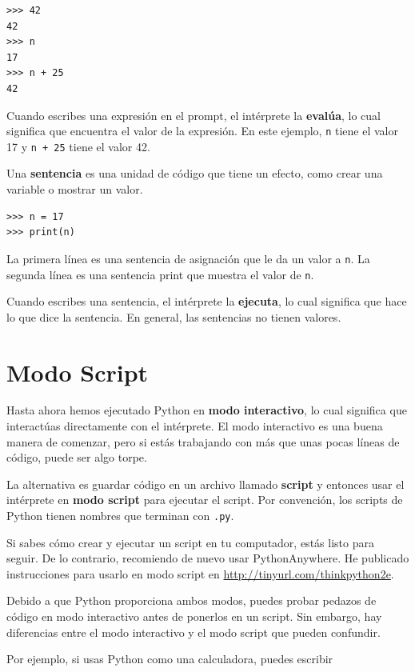\documentclass[10pt]{book}
\begin{document}
\begin{verbatim}
>>> 42
42
>>> n
17
>>> n + 25
42
\end{verbatim}
%
Cuando escribes una expresión en el prompt, el intérprete
la {\bf evalúa}, lo cual significa que encuentra el valor de
la expresión.
En este ejemplo, {\tt n} tiene el valor 17 y
{\tt n + 25} tiene el valor 42.

Una {\bf sentencia} es una unidad de código que tiene un efecto, como
crear una variable o mostrar un valor.

\begin{verbatim}
>>> n = 17
>>> print(n)
\end{verbatim}
%
La primera línea es una sentencia de asignación que le da un valor a
{\tt n}.  La segunda línea es una sentencia print que muestra el
valor de {\tt n}.

Cuando escribes una sentencia, el intérprete la {\bf ejecuta},
lo cual significa que hace lo que dice la sentencia.  En general,
las sentencias no tienen valores.


\section{Modo Script}

Hasta ahora hemos ejecutado Python en {\bf modo interactivo}, lo cual
significa que interactúas directamente con el intérprete.
El modo interactivo es una buena manera de comenzar,
pero si estás trabajando con más que unas pocas líneas de código, puede ser
algo torpe.

La alternativa es guardar código en un archivo llamado {\bf script} y
entonces usar el intérprete en {\bf modo script} para ejecutar el script.  Por
convención, los scripts de Python tienen nombres que terminan con {\tt .py}.

Si sabes cómo crear y ejecutar un script en tu computador, estás
listo para seguir.  De lo contrario, recomiendo de nuevo usar PythonAnywhere.
He publicado instrucciones para usarlo en modo script en
\url{http://tinyurl.com/thinkpython2e}.

Debido a que Python proporciona ambos modos,
puedes probar pedazos de código en modo interactivo antes de ponerlos
en un script.  Sin embargo, hay diferencias entre el modo interactivo
y el modo script que pueden confundir.

Por ejemplo, si usas Python como una calculadora, puedes escribir
\end{document}
